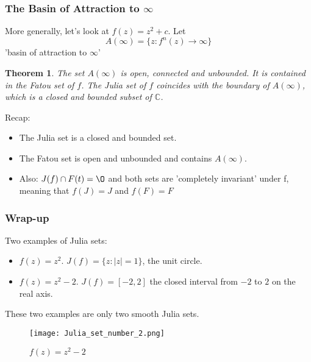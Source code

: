 \documentclass{article}
\newtheorem{theorem}{Theorem}[section]
\begin{document}
\subsubsection{The Basin of Attraction to $\infty$}
More generally, let's look at $f(z) = z^2 + c$. Let
\begin{equation*}
A(\infty) = \{z : f^n(z) \to \infty \}
\end{equation*}
'basin of attraction to $\infty$'
\begin{theorem}
The set $A(\infty)$ is open, connected and unbounded. It is contained in the Fatou set of $f$. The Julia set of $f$ coincides with the boundary of $A(\infty)$, which is a closed and bounded subset of $\mathbb{C}$.
\end{theorem}
Recap:
\begin{itemize}
\item The Julia set is a closed and bounded set.
\item The Fatou set is open and unbounded and contains $A(\infty)$.
\item Also: $J(f) \cap F(t) = \O$ and both sets are 'completely invariant' under f, meaning that $f(J) = J$ and $f(F) = F$
\end{itemize}

\subsubsection{Wrap-up}
Two examples of Julia sets:
\begin{itemize}
\item $f(z) = z^2$. $J(f) = \{z : \left|z\right| = 1\}$, the unit circle.
\item $f(z) = z^2 - 2$. $J(f) = \left[ -2, 2\right]$ the closed interval from $-2$ to $2$ on the real axis.
\end{itemize}
These two examples are only two smooth Julia sets.
\begin{figure}[h!]
\centering
\texttt{[image: Julia\_set\_number\_2.png]}
\caption{$f(z) = z^2 - 2$}
\end{figure}
\end{document}
